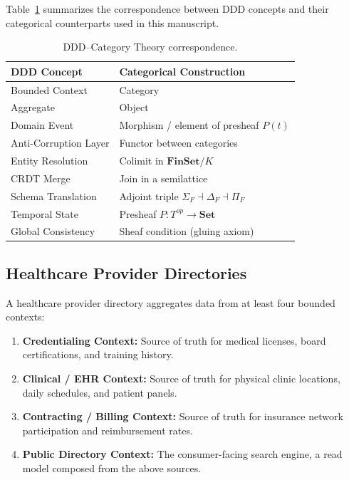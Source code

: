 \documentclass[11pt,a4paper]{article}
\begin{document}
\noindent
Table~\ref{tab:ddd-ct} summarizes the correspondence between DDD
concepts and their categorical counterparts used in this manuscript.

\begin{table}[ht]
\centering
\caption{DDD--Category Theory correspondence.}
\label{tab:ddd-ct}
\begin{tabular}{@{}ll@{}}
\toprule
\textbf{DDD Concept} & \textbf{Categorical Construction} \\
\midrule
Bounded Context      & Category \\
Aggregate            & Object \\
Domain Event         & Morphism / element of presheaf $P(t)$ \\
Anti-Corruption Layer & Functor between categories \\
Entity Resolution    & Colimit in $\mathbf{FinSet}/K$ \\
CRDT Merge           & Join in a semilattice \\
Schema Translation   & Adjoint triple $\Sigma_F \dashv \Delta_F \dashv \Pi_F$ \\
Temporal State       & Presheaf $P:T^{op}\to\mathbf{Set}$ \\
Global Consistency   & Sheaf condition (gluing axiom) \\
\bottomrule
\end{tabular}
\end{table}

\subsection{Healthcare Provider Directories}
\label{sec:healthcare-background}

A healthcare provider directory aggregates data from at least four
bounded contexts:

\begin{enumerate}
  \item \textbf{Credentialing Context:} Source of truth for medical
    licenses, board certifications, and training history.
  \item \textbf{Clinical / EHR Context:} Source of truth for physical
    clinic locations, daily schedules, and patient panels.
  \item \textbf{Contracting / Billing Context:} Source of truth for
    insurance network participation and reimbursement rates.
  \item \textbf{Public Directory Context:} The consumer-facing search
    engine, a read model composed from the above sources.
\end{enumerate}
\end{document}
